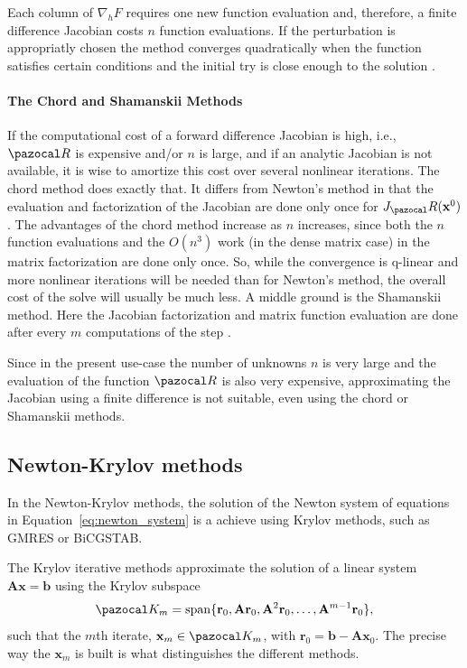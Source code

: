 Each column of \(\nabla_{h} F\) requires one new function evaluation and, therefore, a finite difference Jacobian costs \(n\) function evaluations.
If the perturbation is appropriatly chosen the method converges quadratically when the function satisfies certain conditions and the initial try is close enough to the solution \cite{dennis}.

\paragraph{The Chord and Shamanskii Methods}

If the computational cost of a forward difference Jacobian is high, i.e., \(\pazocal R\) is expensive and/or \(n\) is large, and if an analytic Jacobian is not available, it is wise to amortize this cost over several nonlinear iterations. 
The chord method does exactly that. 
It differs from Newton's method in that the evaluation and factorization of the Jacobian are done only once for \(J_\pazocal R(\mathbf x^0)\). 
The advantages of the chord method increase as \(n\) increases, since both the \(n\) function evaluations and the \(O(n^{3})\) work (in the dense matrix case) in the matrix factorization are done only once. 
So, while the convergence is q-linear and more nonlinear iterations will be needed than for Newton's method, the overall cost of the solve will usually be much less. 
A middle ground is the Shamanskii method. 
Here the Jacobian factorization and matrix function evaluation are done after every \(m\) computations of the step \citep{kelley}.

Since in the present use-case the number of unknowns \(n\) is very large and the evaluation of the function \(\pazocal R\) is also very expensive, approximating the Jacobian using a finite difference is not suitable, even using the chord or Shamanskii methods.


\subsection{Newton-Krylov methods}

In the Newton-Krylov methods, the solution of the Newton system of equations in Equation~\eqref{eq:newton_system} is a achieve using Krylov methods, such as GMRES or BiCGSTAB.

The Krylov iterative methods approximate the solution of a linear system \(\mathbf A \mathbf x = \mathbf b\) using the Krylov subspace
\begin{equation}
  \pazocal K_m = \operatorname{span}\{\mathbf r_0, \mathbf A\mathbf r_0, \mathbf A^2 \mathbf r_0, \dots, \mathbf A^{m-1}\mathbf r_0\},
\end{equation}
such that the \(m\)th iterate, \(\mathbf x_m\in \pazocal K_m\), with \(\mathbf r_0 = \mathbf b - \mathbf A \mathbf x_0\).
The precise way the \(\mathbf x_m\) is built is what distinguishes the different methods.

